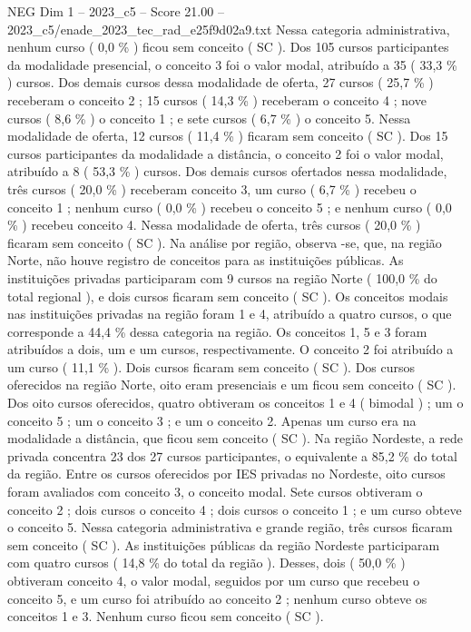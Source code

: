 \begin{textsample}{NEG Dim 1 – 2023\_c5 – Score 21.00 – 2023\_c5/enade\_2023\_tec\_rad\_e25f9d02a9.txt}
Nessa categoria administrativa, nenhum curso ( 0,0 \% ) ficou sem conceito ( SC ).
Dos 105 cursos participantes da modalidade presencial, o conceito 3 foi o valor modal, atribuído a 35 ( 33,3 \% ) cursos.
Dos demais cursos dessa modalidade de oferta, 27 cursos ( 25,7 \% ) receberam o conceito 2 ; 15 cursos ( 14,3 \% ) receberam o conceito 4 ; nove cursos ( 8,6 \% ) o conceito 1 ; e sete cursos ( 6,7 \% ) o conceito 5.
Nessa modalidade de oferta, 12 cursos ( 11,4 \% ) ficaram sem conceito ( SC ).
Dos 15 cursos participantes da modalidade a distância, o conceito 2 foi o valor modal, atribuído a 8 ( 53,3 \% ) cursos.
Dos demais cursos ofertados nessa modalidade, três cursos ( 20,0 \% ) receberam conceito 3, um curso ( 6,7 \% ) recebeu o conceito 1 ; nenhum curso ( 0,0 \% ) recebeu o conceito 5 ; e nenhum curso ( 0,0 \% ) recebeu conceito 4.
Nessa modalidade de oferta, três cursos ( 20,0 \% ) ficaram sem conceito ( SC ).
Na análise por região, observa -se, que, na região Norte, não houve registro de conceitos para as instituições públicas.
As instituições privadas participaram com 9 cursos na região Norte ( 100,0 \% do total regional ), e dois cursos ficaram sem conceito ( SC ).
Os conceitos modais nas instituições privadas na região foram 1 e 4, atribuído a quatro cursos, o que corresponde a 44,4 \% dessa categoria na região.
Os conceitos 1, 5 e 3 foram atribuídos a dois, um e um cursos, respectivamente.
O conceito 2 foi atribuído a um curso ( 11,1 \% ).
Dois cursos ficaram sem conceito ( SC ).
Dos cursos oferecidos na região Norte, oito eram presenciais e um ficou sem conceito ( SC ).
Dos oito cursos oferecidos, quatro obtiveram os conceitos 1 e 4 ( bimodal ) ; um o conceito 5 ; um o conceito 3 ; e um o conceito 2.
Apenas um curso era na modalidade a distância, que ficou sem conceito ( SC ).
Na região Nordeste, a rede privada concentra 23 dos 27 cursos participantes, o equivalente a 85,2 \% do total da região.
Entre os cursos oferecidos por IES privadas no Nordeste, oito cursos foram avaliados com conceito 3, o conceito modal.
Sete cursos obtiveram o conceito 2 ; dois cursos o conceito 4 ; dois cursos o conceito 1 ; e um curso obteve o conceito 5.
Nessa categoria administrativa e grande região, três cursos ficaram sem conceito ( SC ).
As instituições públicas da região Nordeste participaram com quatro cursos ( 14,8 \% do total da região ).
Desses, dois ( 50,0 \% ) obtiveram conceito 4, o valor modal, seguidos por um curso que recebeu o conceito 5, e um curso foi atribuído ao conceito 2 ; nenhum curso obteve os conceitos 1 e 3.
Nenhum curso ficou sem conceito ( SC ).

\end{textsample}
